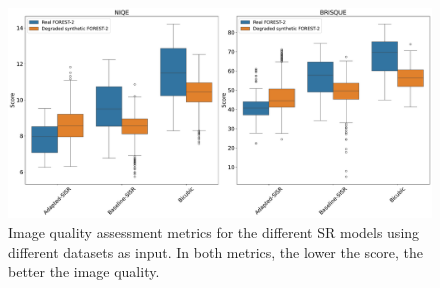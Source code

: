         \begin{figure}[H]
            \centering
            \includegraphics[scale=0.28]{Includes/5-target-iqa-results.pdf}
            \caption{Image quality assessment metrics for the different SR models using different datasets as input. 
                    In both metrics, the lower the score, the better the image quality.}
            \label{fig:5-target-iqa-results}
        \end{figure}


        

        
\newpage
    